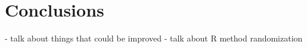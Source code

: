 
\graphicspath{{Body/Figures/}}

\section{Conclusions}


- talk about things that could be improved
- talk about R method randomization
